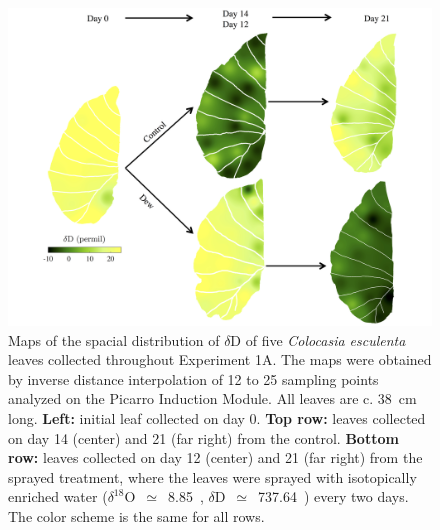 \documentclass[twoside]{article}
\begin{document}
\begin{center}
	\begin{figure}[h!]
		\centering
		\includegraphics[width=\textwidth]{Final_2H_Plot_GoodQ.jpg}
		\caption{Maps of the spacial distribution of $\delta$D of five \textit{Colocasia esculenta} leaves collected throughout Experiment 1A. The maps were obtained by inverse distance interpolation of 12 to 25 sampling points analyzed on the Picarro Induction Module. All leaves are c. 38~cm long. \textbf{Left:} initial leaf collected on day 0. \textbf{Top row:} leaves collected on day 14 (center) and 21 (far right) from the control. \textbf{Bottom row:} leaves collected on day 12 (center) and 21 (far right) from the sprayed treatment, where the leaves were sprayed with isotopically enriched water ($\delta^{18}$O~$\simeq$~8.85~\textperthousand, $\delta$D~$\simeq$~737.64~\textperthousand) every two days. The color scheme is the same for all rows.}\label{expe1A2H}
	\end{figure}
\end{center}
\end{document}
